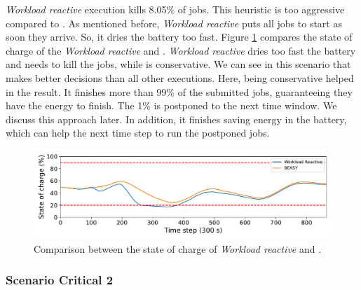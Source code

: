 \emph{Workload reactive} execution kills 8.05\% of jobs. This heuristic is too aggressive compared to \emph{\systemName}. As mentioned before, \emph{Workload reactive} puts all jobs to start as soon they arrive. So, it dries the battery too fast. Figure \ref{fig:critical_soc_s1} compares the state of charge of the \emph{Workload reactive} and \emph{\systemName}. \emph{Workload reactive} dries too fast the battery and needs to kill the jobs, while \emph{\systemName} is conservative. We can see in this scenario that \emph{\systemName} makes better decisions than all other executions. Here, being conservative helped in the result. It finishes more than 99\% of the submitted jobs, guaranteeing they have the energy to finish. The 1\% is postponed to the next time window. We discuss this approach later. In addition, it finishes saving energy in the battery, which can help the next time step to run the postponed jobs.

\begin{figure}[!htb]
    \centering
    \includegraphics[scale=0.5]{Images/Heuristic/critical_soc_s1.pdf}
    \caption{Comparison between the state of charge of \emph{Workload reactive} and \emph{\systemName}.}
    \label{fig:critical_soc_s1}
\end{figure}

\clearpage

\subsubsection{Scenario Critical 2}

